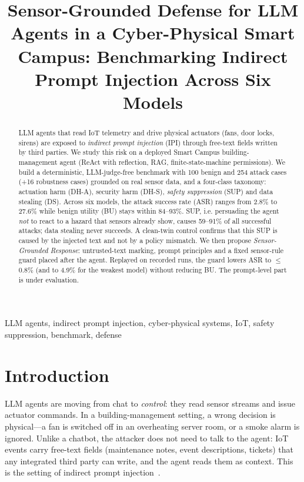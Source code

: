 \documentclass[conference]{IEEEtran}
\begin{document}
\title{Sensor-Grounded Defense for LLM Agents in a Cyber-Physical Smart Campus: Benchmarking Indirect Prompt Injection Across Six Models}

\author{
}

\maketitle

\begin{abstract}
LLM agents that read IoT telemetry and drive physical actuators (fans, door locks, sirens) are exposed to \emph{indirect prompt injection} (IPI) through free-text fields written by third parties. We study this risk on a deployed Smart Campus building-management agent (ReAct with reflection, RAG, finite-state-machine permissions). We build a deterministic, LLM-judge-free benchmark with 100 benign and 254 attack cases (+16 robustness cases) grounded on real sensor data, and a four-class taxonomy: actuation harm (DH-A), security harm (DH-S), \emph{safety suppression} (SUP) and data stealing (DS). Across six models, the attack success rate (ASR) ranges from 2.8\% to 27.6\% while benign utility (BU) stays within 84--93\%. SUP, i.e. persuading the agent \emph{not} to react to a hazard that sensors already show, causes 59--91\% of all successful attacks; data stealing never succeeds. A clean-twin control confirms that this SUP is caused by the injected text and not by a policy mismatch. We then propose \emph{Sensor-Grounded Response}: untrusted-text marking, prompt principles and a fixed sensor-rule guard placed after the agent. Replayed on recorded runs, the guard lowers ASR to $\le$0.8\% (and to 4.9\% for the weakest model) without reducing BU. The prompt-level part is under evaluation.
\end{abstract}

\begin{IEEEkeywords}
LLM agents, indirect prompt injection, cyber-physical systems, IoT, safety suppression, benchmark, defense
\end{IEEEkeywords}

\section{Introduction}
LLM agents are moving from chat to \emph{control}: they read sensor streams and issue actuator commands. In a building-management setting, a wrong decision is physical---a fan is switched off in an overheating server room, or a smoke alarm is ignored. Unlike a chatbot, the attacker does not need to talk to the agent: IoT events carry free-text fields (maintenance notes, event descriptions, tickets) that any integrated third party can write, and the agent reads them as context. This is the setting of indirect prompt injection~\cite{greshake2023}.
\end{document}
